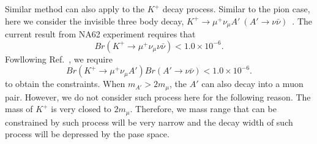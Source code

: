 \documentclass[onecolumn, aps, nofootinbib, prd, preprint, floats, floatfix, amsmath, amssymb, superscriptaddress, preprintnumbers]{revtex4-1}
\newcommand{\zb}[1]{{\color{blue} {#1}}}
\begin{document}
\zb{Similar method can also apply to the $K^+$ decay process. Similar to the pion case, here we consider the invisible three body decay, $K^+ \to \mu^+ \nu_\mu A'\ (A' \to \nu\bar\nu)$~\cite{cogollo2025constraints}. The current result from NA62 experiment requires that~\cite{gil2021search} 
\begin{equation}
Br(K^+ \to \mu^+ \nu_\mu \nu\bar\nu) < 1.0 \times 10^{-6}.
\end{equation}
Fowllowing Ref.~\cite{cogollo2025constraints}, we require 
\begin{equation}
Br(K^+ \to \mu^+ \nu_\mu A')Br(A' \to \nu\bar\nu) < 1.0 \times 10^{-6}.
\end{equation}
to obtain the constraints. When $m_{A'} > 2 m_\mu$, the $A'$ can also decay into a muon pair. However, we do not consider such process here for the following reason. The mass of $K^+$ is very closed to $2 m_\mu$. Therefore, we mass range that can be constrained by such process will be very narrow and the decay width of such process will be depressed by the pase space.   

}
\end{document}
